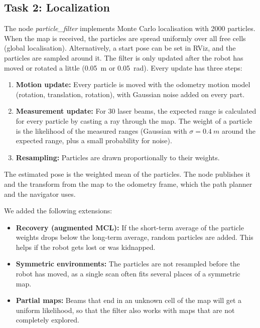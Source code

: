 \documentclass[../report.tex]{subfiles}
\begin{document}
    \subsection{Task 2: Localization}
    \label{sec:describing_code:task2}

    The node \emph{particle\_filter} implements Monte Carlo localisation with 2000 particles.
    When the map is received, the particles are spread uniformly over all free cells (global localisation).
    Alternatively, a start pose can be set in RViz, and the particles are sampled around it.
    The filter is only updated after the robot has moved or rotated a little (\SI{0.05}{m} or \SI{0.05}{rad}). Every update has three steps:
    \begin{enumerate}
        \item \textbf{Motion update:} Every particle is moved with the odometry motion model (rotation, translation, rotation), with Gaussian noise added on every part.
        \item \textbf{Measurement update:} For 30 laser beams, the expected range is calculated for every particle by casting a ray through the map. The weight of a particle is the likelihood of the measured ranges (Gaussian with $\sigma = \SI{0.4}{m}$ around the expected range, plus a small probability for noise).
        \item \textbf{Resampling:} Particles are drawn proportionally to their weights.
    \end{enumerate}
    The estimated pose is the weighted mean of the particles.
    The node publishes it and the transform from the map to the odometry frame, which the path planner and the navigator uses.

    We added the following extensions:
    \begin{itemize}
        \item \textbf{Recovery (augmented MCL):} If the short-term average of the particle weights drops below the long-term average, random particles are added. This helps if the robot gets lost or was kidnapped.
        \item \textbf{Symmetric environments:} The particles are not resampled before the robot has moved, as a single scan often fits several places of a symmetric map.
        \item \textbf{Partial maps:} Beams that end in an unknown cell of the map will get a uniform likelihood, so that the filter also works with maps that are not completely explored.
    \end{itemize}
\end{document}
